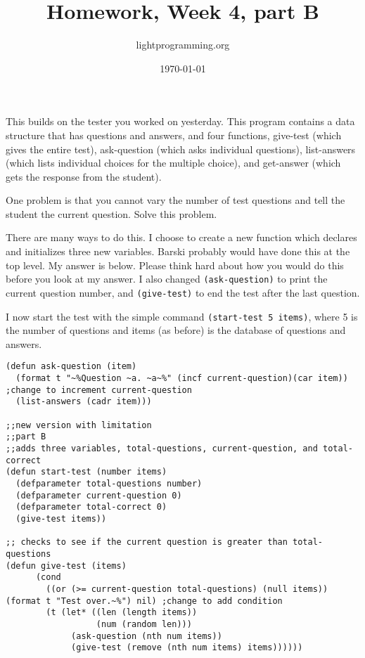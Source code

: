 \documentclass{article}
\title{Homework, Week 4, part B}
\author{lightprogramming.org}
\date{\today}
\begin{document}
\maketitle{}

This builds on the tester you worked on yesterday. This program contains a data structure that has questions and answers, and four functions, give-test (which gives the entire test), ask-question (which asks individual questions), list-answers (which lists individual choices for the multiple choice), and get-answer (which gets the response from the student).

One problem is that you cannot vary the number of test questions and tell the student the current question. Solve this problem.

There are many ways to do this. I choose to create a new function which declares and initializes three new variables. Barski probably would have done this at the top level. My answer is below. Please think hard about how you would do this before you look at my answer. I also changed \texttt{(ask-question)} to print the current question number, and \texttt{(give-test)} to end the test after the last question.

I now start the test with the simple command \texttt{(start-test 5 items)}, where 5 is the number of questions and items (as before) is the database of questions and answers.

\lstset{language=Lisp,numbers=left,keepspaces=false,basicstyle=\small,numberstyle=\tiny,breaklines=true,showstringspaces=false}
\begin{lstlisting}
(defun ask-question (item)
  (format t "~%Question ~a. ~a~%" (incf current-question)(car item)) ;change to increment current-question
  (list-answers (cadr item)))

;;new version with limitation
;;part B
;;adds three variables, total-questions, current-question, and total-correct
(defun start-test (number items)
  (defparameter total-questions number)
  (defparameter current-question 0)
  (defparameter total-correct 0)
  (give-test items))

;; checks to see if the current question is greater than total-questions
(defun give-test (items)
      (cond
        ((or (>= current-question total-questions) (null items)) (format t "Test over.~%") nil) ;change to add condition
        (t (let* ((len (length items))
                  (num (random len)))
             (ask-question (nth num items))
             (give-test (remove (nth num items) items))))))
\end{lstlisting}
\end{document}
